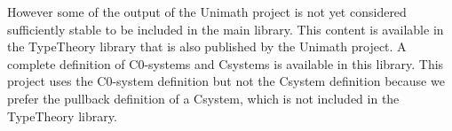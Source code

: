 \documentclass[12pt,a4paper,twoside,openright]{report}
\begin{document}
However some of the output of the Unimath project is not yet considered
sufficiently stable to be included in the main library. This content is
available in the TypeTheory library that is also published by the Unimath
project. A complete definition of C0-systems and Csystems is available in this
library. This project uses the C0-system definition but not the Csystem
definition because we prefer the pullback definition of a Csystem, which is not
included in the TypeTheory library.
\end{document}
